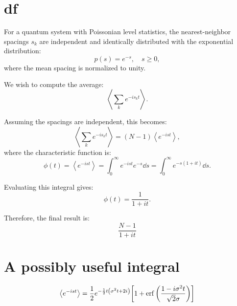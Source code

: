 \documentclass[10pt,a4paper]{article}
\begin{document}
\section{df}
For a quantum system with Poissonian level statistics, the nearest-neighbor spacings $s_k$ are independent and identically distributed with the exponential distribution:
\[
p(s) = e^{-s}, \quad s \geq 0,
\]
where the mean spacing is normalized to unity.

We wish to compute the average:
\[
\left\langle \sum_k e^{-i s_k t} \right\rangle.
\]

Assuming the spacings are independent, this becomes:
\[
\left\langle \sum_k e^{-i s_k t} \right\rangle = (N-1) \left\langle e^{-i s t} \right\rangle,
\]
where the characteristic function is:
\[
\phi(t) = \left\langle e^{-i s t} \right\rangle = \int_0^\infty e^{-i s t} e^{-s} \dd{s} = \int_0^\infty e^{-s(1 + i t)} \dd{s}.
\]

Evaluating this integral gives:
\[
\phi(t) = \frac{1}{1 + i t}.
\]

Therefore, the final result is:
\[
\boxed{\frac{N-1}{1+it}}
\]

\section{A possibly useful integral}
\begin{equation}
\expval{e^{-ist}} =
\frac{1}{2}
e^{-\frac{1}{2} t \left(\sigma ^2 t+2 i\right)} 
\qty[
1 + \erf\qty(\frac{1 - i\sigma^2 t}{\sqrt{2}\sigma})
]
\end{equation}

\printbibliography
\end{document}
